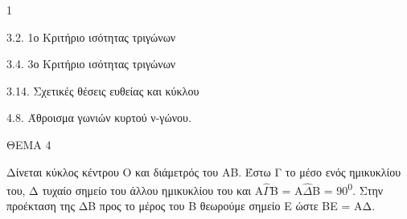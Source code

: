 \begin{ylh}{1}
    \item 3.2. 1ο Κριτήριο ισότητας τριγώνων
    \item 3.4. 3ο Κριτήριο ισότητας τριγώνων
    \item 3.14. Σχετικές θέσεις ευθείας και κύκλου
    \item 4.8. Άθροισμα γωνιών κυρτού ν-γώνου.
\end{ylh}

ΘΕΜΑ 4

Δίνεται κύκλος κέντρου Ο και διάμετρός του ΑΒ. Έστω Γ το μέσο ενός ημικυκλίου του, Δ τυχαίο σημείο του άλλου ημικυκλίου του και Α$\widehat{\Gamma}$Β = Α$\widehat{\Delta}$Β = 90\textsuperscript{0}. Στην προέκταση της ΔΒ προς το μέρος του Β θεωρούμε σημείο Ε ώστε ΒΕ = ΑΔ.

